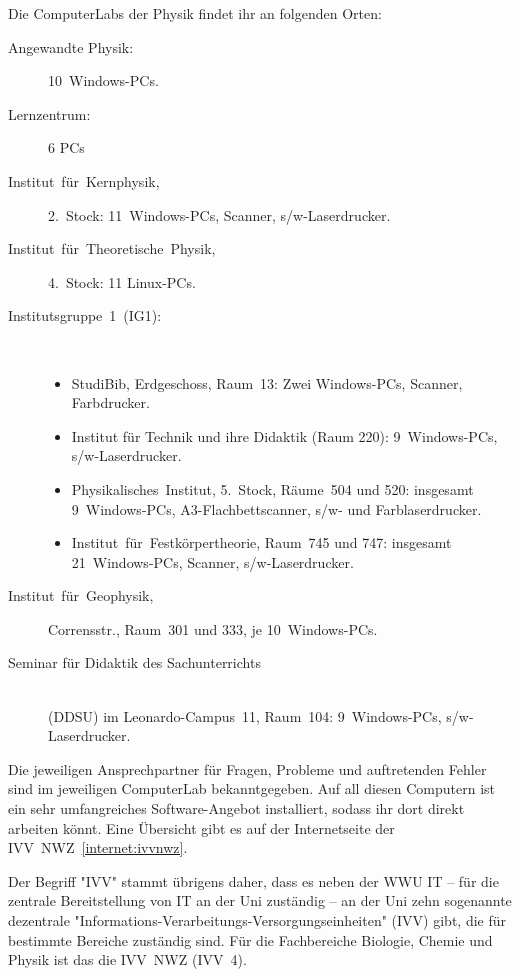 \begin{multicols*}{2}
Die ComputerLabs der Physik findet ihr an folgenden Orten:
\begin{description}
	\item[Angewandte Physik:] 10~Windows-PCs.
	\item[Lernzentrum:] 6 PCs
	\item[Institut~für~Kernphysik,] 2.~Stock: 11~Windows-PCs, Scanner, s/w-Laserdrucker.
	\item[Institut~für~Theoretische~Physik,] 4.~Stock: 11 Linux-PCs.
	\item[Institutsgruppe~1~(IG1):]~
		\begin{itemize}[leftmargin=1mm]
			\item StudiBib, Erdgeschoss, Raum~13: Zwei Windows-PCs, Scanner, Farbdrucker.
			\item Institut für Technik und ihre Didaktik (Raum 220): 9~Windows-PCs, s/w-Laserdrucker.
			\item Physikalisches~Institut, 5.~Stock, Räume~504 und 520: insgesamt 9~Windows-PCs, A3-Flachbettscanner, s/w- und Farblaserdrucker.
			\item Institut~für~Festkörpertheorie, Raum~745 und 747: insgesamt 21~Windows-PCs, Scanner, s/w-Laserdrucker.
		\end{itemize}
	\item[Institut~für~Geophysik,] Corrensstr., Raum~301 und 333, je 10~Windows-PCs.
	\item[Seminar für Didaktik des Sachunterrichts]~\\(DDSU) im Leonardo-Campus~11, Raum~104: 9~Windows-PCs, s/w-Laserdrucker.
\end{description}

Die jeweiligen Ansprechpartner für Fragen, Probleme und auftretenden Fehler sind im jeweiligen ComputerLab bekanntgegeben.
Auf all diesen Computern ist ein sehr umfangreiches Software-Angebot installiert, sodass ihr dort direkt arbeiten könnt.
Eine Übersicht gibt es auf der Internetseite der IVV~NWZ~\cref{internet:ivvnwz}.

Der Begriff "IVV" stammt übrigens daher, dass es neben der WWU IT -- für die zentrale Bereitstellung von IT an der Uni zuständig -- an der Uni zehn sogenannte dezentrale "Informations-Verarbeitungs-Versorgungseinheiten" (IVV) gibt, die für bestimmte Bereiche zuständig sind.
Für die Fachbereiche Biologie, Chemie und Physik ist das die IVV~NWZ (IVV~4).



\end{multicols*}
